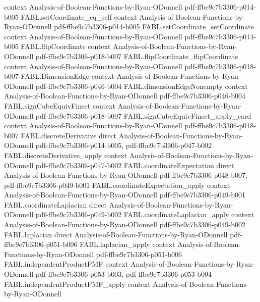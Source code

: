 \begin{theorem}
  {context}
  {Analysis-of-Boolean-Functions-by-Ryan-ODonnell}
  {pdf-ffbe9c7b3306-p014-b005}
\proofstep
  {FABL.setCoordinate_eq_self}
  {context}
  {Analysis-of-Boolean-Functions-by-Ryan-ODonnell}
  {pdf-ffbe9c7b3306-p014-b005}
\proofstep
  {FABL.setCoordinate_setCoordinate}
  {context}
  {Analysis-of-Boolean-Functions-by-Ryan-ODonnell}
  {pdf-ffbe9c7b3306-p014-b005}
\proofstep
  {FABL.flipCoordinate}
  {context}
  {Analysis-of-Boolean-Functions-by-Ryan-ODonnell}
  {pdf-ffbe9c7b3306-p018-b007}
\proofstep
  {FABL.flipCoordinate_flipCoordinate}
  {context}
  {Analysis-of-Boolean-Functions-by-Ryan-ODonnell}
  {pdf-ffbe9c7b3306-p018-b007}
\proofstep
  {FABL.DimensionEdge}
  {context}
  {Analysis-of-Boolean-Functions-by-Ryan-ODonnell}
  {pdf-ffbe9c7b3306-p046-b004}
\proofstep
  {FABL.dimensionEdgeNonempty}
  {context}
  {Analysis-of-Boolean-Functions-by-Ryan-ODonnell}
  {pdf-ffbe9c7b3306-p046-b004}
\proofstep
  {FABL.signCubeEquivFinset}
  {context}
  {Analysis-of-Boolean-Functions-by-Ryan-ODonnell}
  {pdf-ffbe9c7b3306-p018-b007}
\proofstep
  {FABL.signCubeEquivFinset_apply_card}
  {context}
  {Analysis-of-Boolean-Functions-by-Ryan-ODonnell}
  {pdf-ffbe9c7b3306-p018-b007}
\proofstep
  {FABL.discreteDerivative}
  {direct}
  {Analysis-of-Boolean-Functions-by-Ryan-ODonnell}
  {pdf-ffbe9c7b3306-p014-b005,
    pdf-ffbe9c7b3306-p047-b002}
\proofstep
  {FABL.discreteDerivative_apply}
  {context}
  {Analysis-of-Boolean-Functions-by-Ryan-ODonnell}
  {pdf-ffbe9c7b3306-p047-b002}
\proofstep
  {FABL.coordinateExpectation}
  {direct}
  {Analysis-of-Boolean-Functions-by-Ryan-ODonnell}
  {pdf-ffbe9c7b3306-p048-b007,
    pdf-ffbe9c7b3306-p049-b001}
\proofstep
  {FABL.coordinateExpectation_apply}
  {context}
  {Analysis-of-Boolean-Functions-by-Ryan-ODonnell}
  {pdf-ffbe9c7b3306-p049-b001}
\proofstep
  {FABL.coordinateLaplacian}
  {direct}
  {Analysis-of-Boolean-Functions-by-Ryan-ODonnell}
  {pdf-ffbe9c7b3306-p049-b002}
\proofstep
  {FABL.coordinateLaplacian_apply}
  {context}
  {Analysis-of-Boolean-Functions-by-Ryan-ODonnell}
  {pdf-ffbe9c7b3306-p049-b002}
\proofstep
  {FABL.laplacian}
  {direct}
  {Analysis-of-Boolean-Functions-by-Ryan-ODonnell}
  {pdf-ffbe9c7b3306-p051-b006}
\proofstep
  {FABL.laplacian_apply}
  {context}
  {Analysis-of-Boolean-Functions-by-Ryan-ODonnell}
  {pdf-ffbe9c7b3306-p051-b006}
\proofstep
  {FABL.independentProductPMF}
  {context}
  {Analysis-of-Boolean-Functions-by-Ryan-ODonnell}
  {pdf-ffbe9c7b3306-p053-b003,
    pdf-ffbe9c7b3306-p053-b004}
\proofstep
  {FABL.independentProductPMF_apply}
  {context}
  {Analysis-of-Boolean-Functions-by-Ryan-ODonnell}

\end{theorem}
